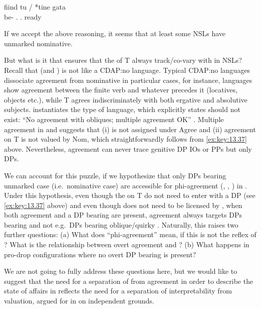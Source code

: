 \documentclass[output=paper]{langsci/langscibook}
\begin{document}
\begin{exe}
\ea\label{ex:key:13.42} \citep{Alboiu2009}
    \sn
    \gll fiind tu / *tine gata\\
    be-\Ger{}    \Ssg.\Nom{} {} \hphantom{*}\Ssg.\Acc{} ready\\
    \glt
\z

If we accept the above reasoning, it seems that at least some \glspl{NSL} have
unmarked nominative.

But what is it that ensures that the  of T always track/co-vary
with \Nom{} in \glspl{NSL}? Recall that  (and ) is not
like a CDAP:no language. Typical CDAP:no languages dissociate agreement from
nominative in particular cases, for instance,  languages show agreement
between the finite verb and whatever precedes it (locatives, objects etc.),
while  T agrees indiscriminately with both ergative and
absolutive subjects.  instantiates
the type of language, which \citet{Baker2008} explicitly states should not
exist: “No agreement with obliques; multiple agreement OK” \parencite[223,
(113d)]{Baker2008}. Multiple agreement in  and  suggests
that (i) \Nom{} is not assigned under Agree and (ii) agreement on T is not
valued by Nom, which straightforwardly follows from \eqref{ex:key:13.37} above.
Nevertheless, agreement can never trace genitive DP
\glspl{IO} or PPs but only \Nom{} DPs.

We can account for this puzzle, if we hypothesize that only DPs bearing
unmarked case (i.e.\ nominative case) are accessible for
phi-agreement (\citealt{Bobaljik2008}, \citealt{Preminger2014},
\citealt{Baker2015}) in . Under this hypothesis, even though the
 on T do not need to enter  with a DP (see
\eqref{ex:key:13.37} above) and even though \Nom{} does not need to be licensed
by , when both agreement and a DP bearing \Nom{} are present,
agreement always targets DPs bearing \Nom{} and not e.g.\ DPs bearing
oblique/quirky \Gen. Naturally, this raises two further questions: (a) What
does \enquote{phi-agreement} mean, if this is not the reflex of ?
What is the relationship between overt agreement and ? (b) What
happens in pro-drop configurations where no overt DP bearing \Nom{} is present?

We are not going to fully address these questions here, but we would like to
suggest that the need for a separation of  from agreement in order
to describe the state of affairs in  reflects the need for a
separation of interpretability from valuation, argued for in
\citet{PesetskyTorrego2007} on independent grounds.


\end{exe}
\end{document}
